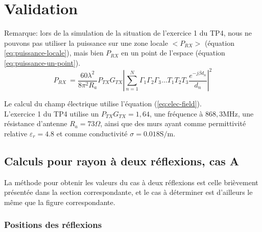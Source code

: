 \chapter{Validation}
\label{chapter-3}





Remarque: lors de la simulation de la situation de l'exercice 1 du TP4, nous ne pouvons pas utiliser la puissance sur une zone locale $<P_{RX}>$ (équation \ref{eq:puissance-locale}), mais bien $P_{RX}$ en un point de l'espace (équation \ref{eq:puissance-un-point}).
\begin{equation}
    \label{eq:puissance-un-point}
    P_{RX}\ = \frac{60 \lambda^2}{8 \pi^2 R_a}P_{TX}G_{TX} \left| \sum_{n=1}^N \Gamma_1 \Gamma_2 \Gamma_3 \dotsc T_1 T_2 T_3 \frac{e^{-j \beta d_n}}{d_n} \right|^2
\end{equation}

Le calcul du champ électrique utilise l'équation (\ref{eq:elec-field}).\\

L'exercice 1 du TP4 utilise un $P_{TX}G_{TX}=1,64$, une fréquence à $868,3 \mathrm{MHz}$, une résistance d'antenne $R_a=73 \Omega$, ainsi que des murs ayant comme permittivité relative $\varepsilon_r=4.8$ et comme conductivité $\sigma=0.018 \mathrm{S/m}$.

\section{Calculs pour rayon à deux réflexions, cas A}
La m{\'e}thode pour obtenir les valeurs du cas {\`a} deux r{\'e}flexions est
celle bri{\`e}vement pr{\'e}sent{\'e}e dans la section correspondante, et le
cas {\`a} d{\'e}terminer est d'ailleurs le m{\^e}me que la figure
correspondante.

\subsection{Positions des r{\'e}flexions}

